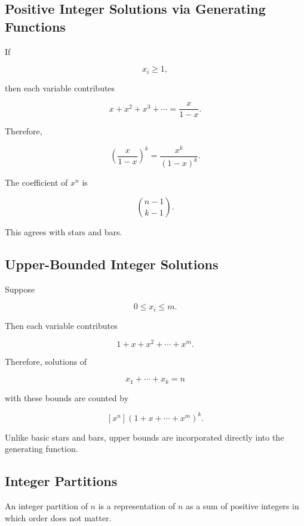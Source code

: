 \subsection{Positive Integer Solutions via Generating Functions}
\label{subsec:positive-solutions-gf}

If

\[
x_i\geq1,
\]

then each variable contributes

\[
x+x^2+x^3+\cdots
=
\frac{x}{1-x}.
\]

Therefore,

\[
\left(
\frac{x}{1-x}
\right)^k
=
\frac{x^k}{(1-x)^k}.
\]

The coefficient of \(x^n\) is

\[
\boxed{
\binom{n-1}{k-1}.
}
\]

This agrees with stars and bars.

\subsection{Upper-Bounded Integer Solutions}
\label{subsec:upper-bounded-solutions-gf}

Suppose

\[
0\leq x_i\leq m.
\]

Then each variable contributes

\[
1+x+x^2+\cdots+x^m.
\]

Therefore, solutions of

\[
x_1+\cdots+x_k=n
\]

with these bounds are counted by

\[
\boxed{
[x^n]
(1+x+\cdots+x^m)^k.
}
\]

Unlike basic stars and bars, upper bounds are incorporated directly into
the generating function.

\subsection{Integer Partitions}
\label{subsec:integer-partitions-gf}

An integer partition of \(n\) is a representation of \(n\) as a sum of
positive integers in which order does not matter.


